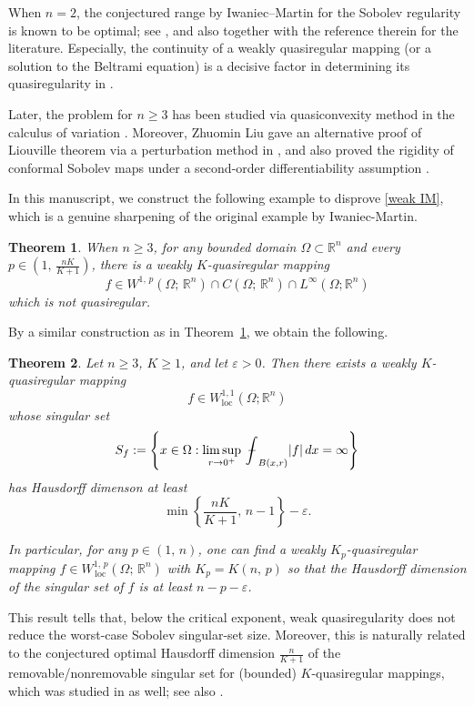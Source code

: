 \documentclass[reqno,11pt]{amsart}
\def\loc{{\mathop\mathrm{\,loc\,}}}
\def\eps{\varepsilon}
\def\bint{{\ifinner\rlap{\bf\kern.35em--}
\int\else\rlap{\bf\kern.45em--}\int\fi}\ignorespaces}
\def\epsilon{\varepsilon}
\newtheorem{thm}{Theorem}[section]
\numberwithin{equation}{section}
\theoremstyle{remark}
\def\bint{{\ifinner\rlap{\bf\kern.35em--}
\int\else\rlap{\bf\kern.45em--}\int\fi}\ignorespaces}
\begin{document}
When $n=2$, the conjectured range by Iwaniec--Martin  for the Sobolev regularity is known to be optimal; see \cite[Theorem 14.4.3 \& Theorem 14.4.6.]{AIM2009}, and also \cite{A1994, AIS2001, PV2002} together with the reference therein for the literature. Especially,  the continuity of a weakly quasiregular mapping (or a solution to the Beltrami equation) is a decisive factor in determining its quasiregularity in \cite{PV2002}.


Later, the problem for $n\ge 3$ has been studied via quasiconvexity method in the calculus of variation \cite{Y1996, Y2001, I2002}. Moreover, 
Zhuomin Liu gave an alternative proof of Liouville theorem via a perturbation method in \cite{L2013}, and also proved the rigidity of conformal Sobolev maps under a second-order differentiability assumption \cite{L20132}. 

In this manuscript, we construct the following example to disprove \eqref{weak IM}, which is a genuine sharpening of the original example by Iwaniec-Martin.
\begin{thm}\label{main thm}
    When $n\ge3$, for any bounded domain $\Omega\subset \mathbb R^n$ and every $p\in \left(1,\,\frac{nK}{K+1}\right)$, there is a weakly $K$-quasiregular mapping 
    $$f\in W^{1,\,p}(\Omega;\,\mathbb R^n)\cap C(\Omega;\,\mathbb R^n)
   \cap L^\infty(\Omega;\mathbb R^n)$$
    which is not quasiregular.
\end{thm}

By a similar construction as in Theorem~\ref{main thm}, we obtain the following.
\begin{thm}\label{dimension}
Let $n\geq 3$, $K\geq 1$, and let $\epsilon>0$. 
Then there exists a weakly $K$-quasiregular mapping
$$
    f\in W^{1,1}_{\operatorname{loc}}(\Omega;\mathbb R^n)
$$
whose singular set
$$    S_f    :=    \left\{        x\in\Omega:        \limsup_{r\to 0^+}        \bint_{B(x,r)} |f|\,dx        =\infty    \right\}
$$
has Hausdorff dimenson at least 
$$    \min\left\{\frac{nK}{K+1},\,n-1\right\} -\epsilon.$$
    
    In particular, for any $p\in \left(1,\,n\right)$, one can find a weakly $K_p$-quasiregular mapping $f\in W^{1,\,p}_{\loc}(\Omega;\,\mathbb R^n)$ with $K_p=K(n,\,p)$ so that the Hausdorff dimension of the singular set of $f$ is at least $n-p-\eps$.
\end{thm}

This result tells that, below the critical exponent, weak quasiregularity does not reduce the worst-case Sobolev singular-set size. Moreover, this is naturally related to the conjectured optimal Hausdorff dimension $\frac n{K+1}$ of the removable/nonremovable singular set for (bounded) $K$-quasiregular mappings, which was studied in \cite{IM1993} as well; see also \cite{GMP2017}. 
\end{document}
